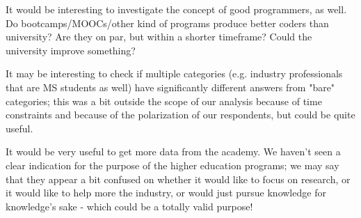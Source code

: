 \documentclass{sigchi}
\begin{document}
It would be interesting to investigate the concept of good programmers, as well. Do bootcamps/MOOCs/other kind of programs produce better coders than university? Are they on par, but within a shorter timeframe? Could the university improve something?

It may be interesting to check if multiple categories (e.g. industry professionals that are MS students as well) have significantly different answers from "bare" categories; this was a bit outside the scope of our analysis because of time constraints and because of the polarization of our respondents, but could be quite useful.

It would be very useful to get more data from the academy. We haven't seen a clear indication for the purpose of the higher education programs; we may say that they appear a bit confused on whether it would like to focus on research, or it would like to help more the industry, or would just pursue knowledge for knowledge's sake - which could be a totally valid purpose!

\balance{}

\balance{}



\end{document}
